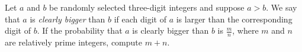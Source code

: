 Let $a$ and $b$ be randomly selected three-digit integers and suppose $a > b$.
We say that $a$ is \emph{clearly bigger} than $b$ if each digit of $a$ is larger than the corresponding digit of $b$.
If the probability that $a$ is clearly bigger than $b$ is $\tfrac mn$, where $m$ and $n$ are relatively prime integers,
compute $m+n$.
